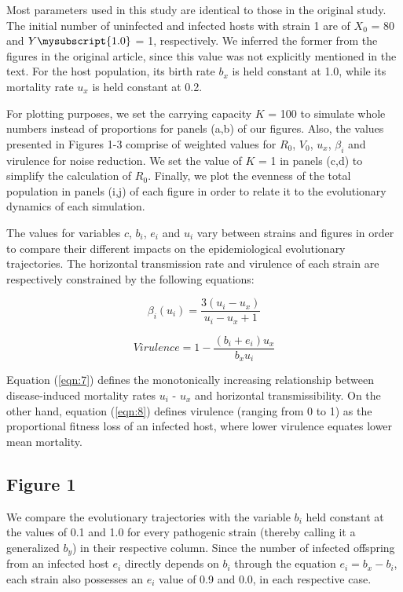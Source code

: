 Most parameters used in this study are identical to those in the original study.
The initial number of uninfected and infected hosts with strain 1 are of
$X_0$ = 80 and $Y\mysubscript{1.0}$ = 1, respectively. We inferred the former
from the figures in the original article, since this value was not explicitly
mentioned in the text. For the host population, its birth rate $b_x$ is held
constant at 1.0, while its mortality rate $u_x$ is held constant at 0.2.

For plotting purposes, we set the carrying capacity $K$ = 100 to simulate whole
numbers instead of proportions for panels (a,b) of our figures. Also, the values
presented in Figures 1-3 comprise of weighted values for $R_0$, $V_0$, $u_x$,
$\beta_i$ and virulence for noise reduction. We set the value of $K$ = 1 in
panels (c,d) to simplify the calculation of $R_0$. Finally, we plot the evenness
of the total population in panels (i,j) of each figure in order to relate it to
the evolutionary dynamics of each simulation.

The values for variables $c$, $b_i$, $e_i$ and $u_i$ vary between strains and
figures in order to compare their different impacts on the epidemiological
evolutionary trajectories. The horizontal transmission rate and virulence of
each strain are respectively constrained by the following equations:

\begin{equation}
\beta_i(u_i) = \frac{3(u_i - u_x)}{u_i - u_x + 1}
\label{eqn:7}
\end{equation}

\begin{equation}
Virulence = 1 - \frac{(b_i + e_i)u_x}{b_x u_i}
\label{eqn:8}
\end{equation}

Equation (\ref{eqn:7}) defines the monotonically increasing relationship
between disease-induced mortality rates $u_i$ - $u_x$ and horizontal
transmissibility. On the other hand, equation (\ref{eqn:8}) defines virulence
(ranging from 0 to 1) as the proportional fitness loss of an infected host,
where lower virulence equates lower mean mortality.

\subsection{Figure 1}

We compare the evolutionary trajectories with the variable $b_i$ held constant
at the values of 0.1 and 1.0 for every pathogenic strain (thereby calling it a
generalized $b_y$) in their respective column. Since the number of infected
offspring from an infected host $e_i$ directly depends on $b_i$ through the
equation $e_i = b_x - b_i$, each strain also possesses an $e_i$ value of 0.9
and 0.0, in each respective case.

